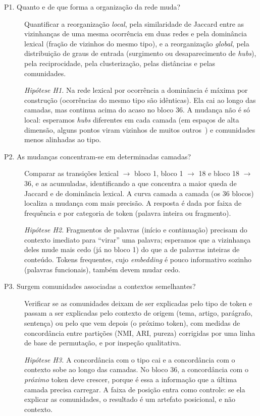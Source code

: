 \begin{description}
    \item[P1. Quanto e de que forma a organização da rede muda?]
    Quantificar a reorganização \emph{local}, pela similaridade de Jaccard entre as vizinhanças
    de uma mesma ocorrência em duas redes e pela dominância lexical (fração de vizinhos do mesmo
    tipo), e a reorganização \emph{global}, pela distribuição de graus de entrada (surgimento ou
    desaparecimento de \emph{hubs}), pela reciprocidade, pela clusterização, pelas distâncias e
    pelas comunidades.

    \emph{Hipótese H1.} Na rede lexical por ocorrência a dominância é máxima por construção
    (ocorrências do mesmo tipo são idênticas). Ela cai ao longo das camadas, mas continua acima
    do acaso no bloco 36. A mudança não é só local: esperamos \emph{hubs} diferentes em cada
    camada (em espaços de alta dimensão, alguns pontos viram vizinhos de muitos
    outros~\cite{radovanovic2010}) e comunidades menos alinhadas ao tipo.

    \item[P2. As mudanças concentram-se em determinadas camadas?]
    Comparar as transições lexical $\to$ bloco 1, bloco 1 $\to$ 18 e bloco 18 $\to$ 36, e as
    acumuladas, identificando a que concentra a maior queda de Jaccard e de dominância lexical.
    A curva camada a camada (os 36 blocos) localiza a mudança com mais precisão. A resposta é
    dada por faixa de frequência e por categoria de token (palavra inteira ou fragmento).

    \emph{Hipótese H2.} Fragmentos de palavras (início e continuação) precisam do contexto
    imediato para ``virar'' uma palavra; esperamos que a vizinhança deles mude mais cedo (já no
    bloco 1) do que a de palavras inteiras de conteúdo. Tokens frequentes, cujo
    \emph{embedding} é pouco informativo sozinho (palavras funcionais), também devem mudar
    cedo.

    \item[P3. Surgem comunidades associadas a contextos semelhantes?]
    Verificar se as comunidades deixam de ser explicadas pelo tipo de token e passam a ser
    explicadas pelo contexto de origem (tema, artigo, parágrafo, sentença) ou pelo que vem
    depois (o próximo token), com medidas de concordância entre partições (NMI, ARI, pureza)
    corrigidas por uma linha de base de permutação, e por inspeção qualitativa.

    \emph{Hipótese H3.} A concordância com o tipo cai e a concordância com o contexto sobe ao
    longo das camadas. No bloco 36, a concordância com o \emph{próximo} token deve crescer,
    porque é essa a informação que a última camada precisa carregar. A faixa de posição entra
    como controle: se ela explicar as comunidades, o resultado é um artefato posicional, e não
    contexto.


\end{description}
